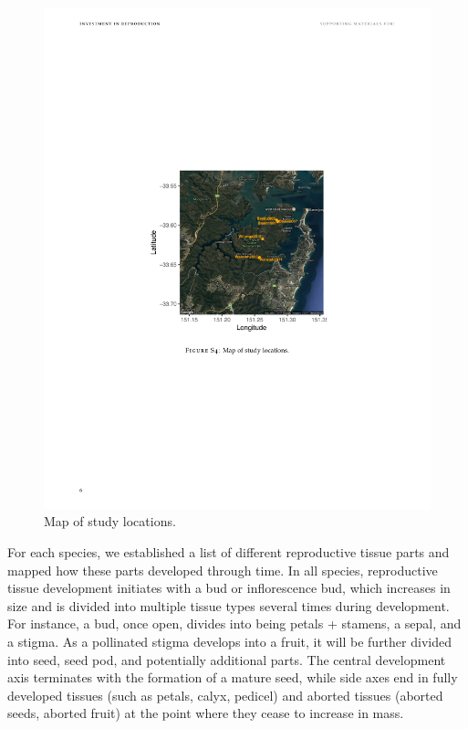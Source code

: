 \documentclass[10pt,twoside]{article}\usepackage[]{graphicx}\usepackage[]{color}
\begin{document}
\begin{figure}[h]
\centering
\includegraphics[]{../map.pdf}
\caption{Map of study locations.}
\label{fig:map}
\end{figure}

For each species, we established a list of different reproductive tissue parts and mapped how these parts developed through time. In all species, reproductive tissue development initiates with a bud or inflorescence bud, which increases in size and is divided into multiple tissue types several times during development. For instance, a bud, once open, divides into being petals + stamens, a sepal, and a stigma. As a pollinated stigma develops into a fruit, it will be further divided into seed, seed pod, and potentially additional parts. The central development axis terminates with the formation of a mature seed, while side axes end in fully developed tissues (such as petals, calyx, pedicel) and aborted tissues (aborted seeds, aborted fruit) at the point where they cease to increase in mass.
\end{document}
